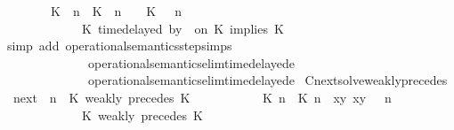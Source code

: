 \begin{isabellebody}
\ \ \ \ \ \ \ \ {\isacharparenleft}{\isacharparenleft}K\ {\isasymUp}\ n{\isacharparenright}\ {\isacharhash}\ {\isacharparenleft}K\ {\isacharat}\ n\ {\isasymoplus}\ {\isasymdelta}{\isasymtau}\ {\isasymRightarrow}\ K\ {\isacharhash}\ {\isasymGamma}{\isacharparenright}{\isacharcomma}\ n\isanewline
\ \ \ \ \ \ \ \ \ \ {\isasymturnstile}\ {\isasymPsi}\ {\isasymtriangleright}\ {\isacharparenleft}{\isacharparenleft}K\ time{\isacharminus}delayed\ by\ {\isasymdelta}{\isasymtau}\ on\ K\ implies\ K\ {\isacharhash}\ {\isasymPhi}{\isacharparenright}\ {\isacharbraceright}{\isacartoucheclose}\isanewline
%
\isadelimproof
%
\endisadelimproof
%
\isatagproof
{}\isamarkupfalse%
\ {\isacharparenleft}simp\ add{\isacharcolon}\ operational{\isacharunderscore}semantics{\isacharunderscore}step{\isachardot}simps\isanewline
\ \ \ \ \ \ \ \ \ \ \ \ \ \ operational{\isacharunderscore}semantics{\isacharunderscore}elim{\isachardot}timedelayed{\isacharunderscore}e{}\isanewline
\ \ \ \ \ \ \ \ \ \ \ \ \ \ operational{\isacharunderscore}semantics{\isacharunderscore}elim{\isachardot}timedelayed{\isacharunderscore}e{}{\isacharparenright}%
\endisatagproof
{\isafoldproof}%
%
\isadelimproof
\isanewline
%
\endisadelimproof
\isanewline
{}\isamarkupfalse%
\ Cnext{\isacharunderscore}solve{\isacharunderscore}weakly{\isacharunderscore}precedes{\isacharcolon}\isanewline
\ \ {\isacartoucheopen}{\isacharparenleft}{\isasymC}\isactrlsub n\isactrlsub e\isactrlsub x\isactrlsub t\ {\isacharparenleft}{\isasymGamma}{\isacharcomma}\ n\ {\isasymturnstile}\ {\isacharparenleft}{\isacharparenleft}K\ weakly\ precedes\ K\ {\isacharhash}\ {\isasymPsi}{\isacharparenright}\ {\isasymtriangleright}\ {\isasymPhi}{\isacharparenright}{\isacharparenright}\isanewline
\ \ \ \ {\isasymsupseteq}\ {\isacharbraceleft}\ {\isacharparenleft}{\isacharparenleft}{\isasymlceil}{\isacharhash}\isactrlsup {\isasymle}\ K\ n{\isacharcomma}\ {\isacharhash}\isactrlsup {\isasymle}\ K\ n{\isasymrceil}\ {\isasymin}\ {\isacharparenleft}{\isasymlambda}{\isacharparenleft}x{\isacharcomma}y{\isacharparenright}{\isachardot}\ x{\isasymle}y{\isacharparenright}{\isacharparenright}\ {\isacharhash}\ {\isasymGamma}{\isacharparenright}{\isacharcomma}\ n\isanewline
\ \ \ \ \ \ \ \ \ \ {\isasymturnstile}\ {\isasymPsi}\ {\isasymtriangleright}\ {\isacharparenleft}{\isacharparenleft}K\ weakly\ precedes\ K\ {\isacharhash}\ {\isasymPhi}{\isacharparenright}\ {\isacharbraceright}{\isacartoucheclose}\isanewline

\end{isabellebody}
